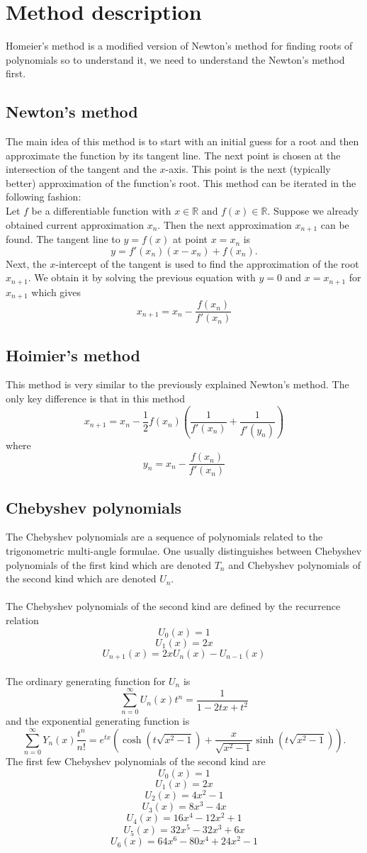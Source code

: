 \documentclass[12pt]{article}
\begin{document}
\lstset{language=Matlab}
\maketitle

\section{Method description}
Homeier's method is a modified version of Newton's method for finding roots of polynomials so to understand it, we need to understand the Newton's method first.
\subsection{Newton's method}
The main idea of this method is to start with an initial guess for a root and then approximate the function by its tangent line. The next point is chosen at the intersection of the tangent and the $x$-axis. This point is the next (typically better) approximation of the function's root. This method can be iterated in the following fashion:\\
Let $f$ be a differentiable function with $x \in \mathbb{R}$ and $f(x)\in\mathbb{R}$. Suppose we already obtained current approximation $x_n$. Then the next approximation $x_{n+1}$ can be found. The tangent line to $y=f(x)$ at point $x=x_n$ is $$y=f'(x_n)(x-x_n)+f(x_n).$$ Next, the $x$-intercept of the tangent is used to find the approximation of the root $x_{n+1}$. We obtain it by solving the previous equation with $y=0$ and $x=x_{n+1}$ for $x_{n+1}$ which gives $$x_{n+1}=x_n-\frac{f(x_n)}{f'(x_n)}$$
\subsection{Hoimier's method}
This method is very similar to the previously explained Newton's method. The only key difference is that in this method $$x_{n+1}=x_n-\frac{1}{2}f(x_n)(\frac{1}{f'(x_n)}+\frac{1}{f'(y_n)})$$ where $$y_n=x_n-\frac{f(x_n)}{f'(x_n)}$$
\subsection{Chebyshev polynomials}
The Chebyshev polynomials are a sequence of polynomials related to the trigonometric multi-angle formulae. One usually distinguishes between Chebyshev polynomials of the first kind which are denoted $T_n$ and Chebyshev polynomials of the second kind which are denoted $U_n$.\\ \\
The Chebyshev polynomials of the second kind are defined by the recurrence relation $$U_0(x)=1$$ $$U_1(x)=2x$$ $$U_{n+1}(x)=2xU_n(x)-U_{n-1}(x)$$\\
The ordinary generating function for $U_n$ is $$\sum\limits_{n=0}^\infty U_n(x)t^n=\frac{1}{1-2tx+t^2}$$
and the exponential generating function is $$\sum\limits_{n=0}^\infty Y_n(x)\frac{t^n}{n!}=e^{tx}(\cosh(t\sqrt{x^2-1})+\frac{x}{\sqrt{x^2-1}}\sinh(t\sqrt{x^2-1})).$$
The first few Chebyshev polynomials of the second kind are
$$U_0(x)	=	1	$$
$$U_1(x)	=	2x	$$
$$U_2(x)	=	4x^2-1	$$
$$U_3(x)	=	8x^3-4x	$$
$$U_4(x)	=	16x^4-12x^2+1	$$
$$U_5(x)	=	32x^5-32x^3+6x	$$
$$U_6(x)	=	64x^6-80x^4+24x^2-1$$
\end{document}
